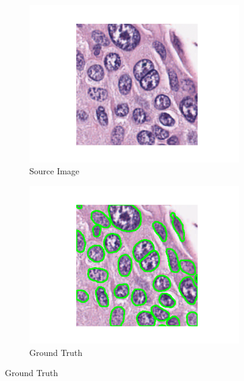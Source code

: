 \documentclass[target=bach,aauheader=,style=]{thud}
\begin{document}
\begin{figure}[!htbp]
\centering

\begin{subfigure}{0.48\textwidth}
  \centering
  \includegraphics[width=\linewidth]{imgs/qualitative/best/RGB/img.png}
  \caption{Source Image}
\end{subfigure}\hfill
\begin{subfigure}{0.48\textwidth}
  \centering
  \includegraphics[width=\linewidth]{imgs/qualitative/best/contour_img.png}
  \caption{Ground Truth}
\end{subfigure}


\end{figure}
\end{document}
